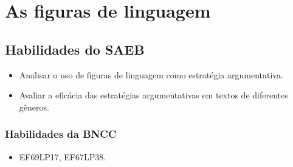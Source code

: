 

\chapter{As figuras de linguagem}

\section*{Habilidades do SAEB}
\begin{itemize}
\item Analisar o uso de figuras de linguagem como
estratégia argumentativa.
\item Avaliar a eficácia das estratégias
argumentativas em textos de diferentes gêneros.
\end{itemize}

\subsection*{Habilidades da BNCC} 
\begin{itemize}
\item EF69LP17, EF67LP38.
\end{itemize}

